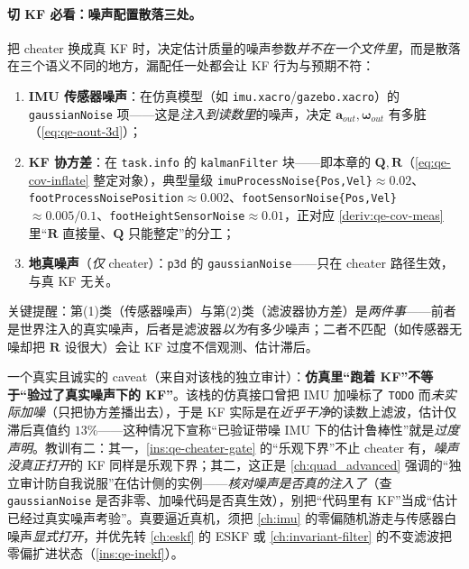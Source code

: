 \paragraph{切 KF 必看：噪声配置散落三处。}
把 cheater 换成真 KF 时，决定估计质量的噪声参数\emph{并不在一个文件里}，而是散落在三个语义不同的地方，漏配任一处都会让 KF 行为与预期不符：
\begin{enumerate}
  \item \textbf{IMU 传感器噪声}：在仿真模型（如 \texttt{imu.xacro}/\allowbreak\texttt{gazebo.\allowbreak xacro}）的 \texttt{gaussianNoise} 项——这是\emph{注入到读数里}的噪声，决定 $\boldsymbol a_{out},\boldsymbol\omega_{out}$ 有多脏（\cref{eq:qe-aout-3d}）；
  \item \textbf{KF 协方差}：在 \texttt{task.info} 的 \texttt{kalmanFilter} 块——即本章的 $\mathbf{Q},\mathbf{R}$（\cref{eq:qe-cov-inflate} 整定对象），典型量级 \texttt{imuProcessNoise\{Pos,Vel\}}$\approx0.02$、\texttt{footProcessNoisePosition}$\approx0.002$、\texttt{footSensorNoise\{Pos,Vel\}}$\approx0.005/0.1$、\texttt{footHeightSensorNoise}$\approx0.01$，正对应 \cref{deriv:qe-cov-meas} 里“$\mathbf{R}$ 直接量、$\mathbf{Q}$ 只能整定”的分工；
  \item \textbf{地真噪声}（\emph{仅} cheater）：\texttt{p3d} 的 \texttt{gaussianNoise}——只在 cheater 路径生效，与真 KF 无关。
\end{enumerate}
关键提醒：第(1)类（传感器噪声）与第(2)类（滤波器协方差）是\emph{两件事}——前者是世界注入的真实噪声，后者是滤波器\emph{以为}有多少噪声；二者不匹配（如传感器无噪却把 $\mathbf{R}$ 设很大）会让 KF 过度不信观测、估计滞后。

\begin{pitfall}\label{pit:qe-clean-kf}
一个真实且诚实的 caveat（来自对该栈的独立审计）：\textbf{仿真里“跑着 KF”不等于“验过了真实噪声下的 KF”}。该栈的仿真接口曾把 IMU 加噪标了 \texttt{TODO} 而\emph{未实际加噪}（只把协方差播出去），于是 KF 实际是在\emph{近乎干净}的读数上滤波，估计仅滞后真值约 $13\%$——这种情况下宣称“已验证带噪 IMU 下的估计鲁棒性”就是\emph{过度声明}。教训有二：其一，\cref{ins:qe-cheater-gate} 的“乐观下界”不止 cheater 有，\emph{噪声没真正打开}的 KF 同样是乐观下界；其二，这正是 \cref{ch:quad_advanced} 强调的“独立审计防自我说服”在估计侧的实例——\emph{核对噪声是否真的注入了}（查 \texttt{gaussianNoise} 是否非零、加噪代码是否真生效），别把“代码里有 KF”当成“估计已经过真实噪声考验”。真要逼近真机，须把 \cref{ch:imu} 的零偏随机游走与传感器白噪声\emph{显式打开}，并优先转 \cref{ch:eskf} 的 ESKF 或 \cref{ch:invariant-filter} 的不变滤波把零偏扩进状态（\cref{ins:qe-inekf}）。
\end{pitfall}

